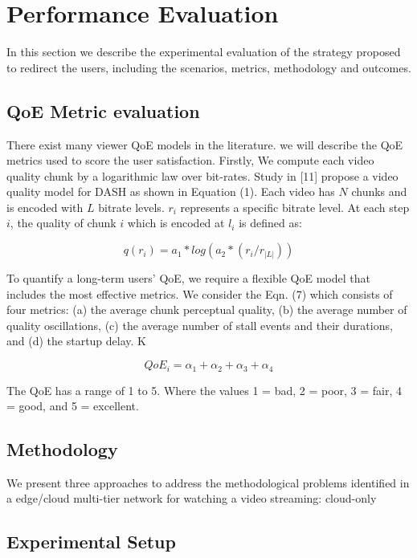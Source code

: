 \section{Performance Evaluation}
\label{sec:results}

In this section we describe the experimental evaluation of the strategy proposed to redirect the users, including the scenarios, metrics, methodology and outcomes.


\subsection{QoE Metric evaluation}

There exist many viewer QoE models in the literature. we will describe the QoE metrics used to score the user satisfaction. Firstly, We compute each video quality chunk by a logarithmic law over bit-rates. Study in [11] propose a video quality model for DASH as shown in Equation (1). Each video has $N$ chunks and is encoded with $L$ bitrate levels. $r_i$ represents a specific bitrate level. At each step $i$, the quality of chunk $i$ which is encoded at $l_i$ is defined as:

$$
q(r_i) = a_1 * log(a_2 * (r_i/ r_{|L|}))
$$

To quantify a long-term users' QoE, we require a flexible QoE model that includes the most effective metrics. 
We consider the Eqn. (7) which consists of four metrics: (a) the average chunk perceptual quality, (b) the average number of quality oscillations, (c) the average number of stall events and their durations, and (d) the startup delay. K

\begin{equation}\label{qoe-equation}
QoE_i = \alpha_1 + \alpha_2 + \alpha_3 + \alpha_4
\end{equation}


The QoE has a range of 1 to 5. Where the values 1 = bad, 2 = poor, 3 = fair, 4 = good, and 5 = excellent.
 
 
\subsection{Methodology}

We present three approaches to address the methodological problems identified in a edge/cloud multi-tier network for watching a video streaming: cloud-only 

\subsection{Experimental Setup}

